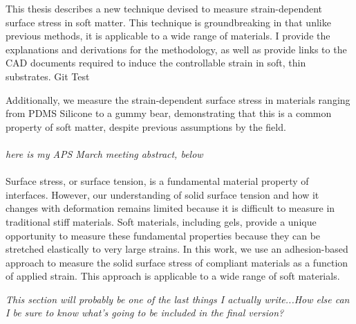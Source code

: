 


This thesis describes a new technique devised to measure strain-dependent surface stress in soft matter. This technique is groundbreaking in that unlike previous methods, it is applicable to a wide range of materials. I provide the explanations and derivations for the methodology, as well as provide links to the CAD documents required to induce the controllable strain in soft, thin substrates. Git Test

Additionally, we measure the strain-dependent surface stress in materials ranging from PDMS Silicone to a gummy bear, demonstrating that this is a common property of soft matter, despite previous assumptions by the field.
\\
\\
\emph{here is my APS March meeting abstract, below}\\
\\
Surface stress, or surface tension, is a fundamental material property of interfaces. However, our understanding of solid surface tension and how it changes with deformation remains limited because it is difficult to measure in traditional stiff materials. Soft materials, including gels, provide a unique opportunity to measure these fundamental properties because they can be stretched elastically to very large strains. In this work, we use an adhesion-based approach to measure the solid surface stress of compliant materials as a function of applied strain. This approach is applicable to a wide range of soft materials.  

\emph{This section will probably be one of the last things I actually write...How else can I be sure to know what's going to be included in the final version?}